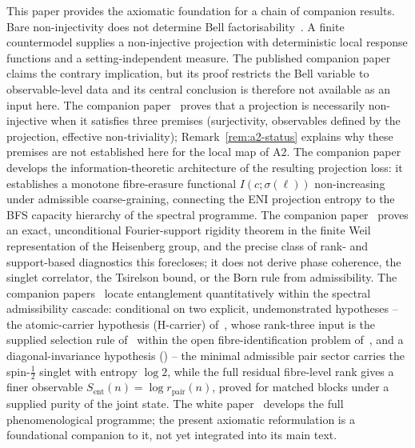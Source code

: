 \documentclass[11pt,a4paper]{article}
\begin{document}
    This paper provides the axiomatic foundation for a chain of companion results.
    Bare non-injectivity does not determine Bell factorisability~\cite{Beau2026BellNoGo}.
    A finite countermodel supplies a non-injective projection with deterministic local
    response functions and a setting-independent measure.
    The published companion paper~\cite{Beau2026b} claims the contrary implication,
    but its proof restricts the Bell variable to observable-level data and its central
    conclusion is therefore not available as an input here.
    The companion paper~\cite{Beau2026l} proves that a projection is necessarily non-injective
    when it satisfies three premises (surjectivity, observables defined by the projection, effective
    non-triviality); Remark~\ref{rem:a2-status} explains why these premises are not established here
    for the local map of A2.
    The companion paper~\cite{Beau2026fe} develops the information-theoretic
    architecture of the resulting projection loss:
    it establishes a monotone fibre-erasure functional $I(c;\sigma(\ell))$
    non-increasing under admissible coarse-graining,
    connecting the ENI projection entropy to the BFS capacity hierarchy
    of the spectral programme.
    The companion paper~\cite{Beau2026q1} proves an exact, unconditional Fourier-support
    rigidity theorem in the finite Weil representation of the Heisenberg group, and the
    precise class of rank- and support-based diagnostics this forecloses; it does not
    derive phase coherence, the singlet correlator, the Tsirelson bound, or the Born
    rule from admissibility.
    The companion papers~\cite{Beau2026entnote,Beau2026ent1,Beau2026ent2} locate entanglement
    quantitatively within the spectral admissibility cascade:
    conditional on two explicit, undemonstrated hypotheses -- the atomic-carrier hypothesis
    (H-carrier) of~\cite{Beau2026ent2}, whose rank-three input is the supplied selection rule
    of~\cite{Beau2026a27} within the open fibre-identification problem of~\cite{Beau2026a22},
    and a diagonal-invariance hypothesis (\cite{Beau2026q3}) -- the minimal
    admissible pair sector carries the spin-$\tfrac12$ singlet with entropy $\log 2$, while the
    full residual fibre-level rank gives a finer observable $S_{\mathrm{ent}}(n)=\log r_{\mathrm{pair}}(n)$,
    proved for matched blocks under a supplied purity of the joint state.
    The white paper~\cite{Cosmochrony} develops the full phenomenological programme;
    the present axiomatic reformulation is a foundational companion to it, not yet
    integrated into its main text.
\end{document}
